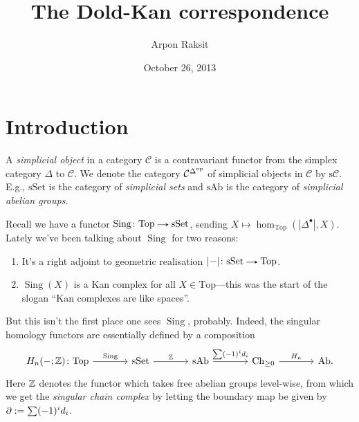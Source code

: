 

\title{The Dold-Kan correspondence}
\author{Arpon Raksit}
\date{October 26, 2013}


\maketitle
\thispagestyle{fancy}


\renewcommand{\C}{\mathcal{C}}
\newcommand{\Top}{\mathrm{Top}}
\newcommand{\Set}{\mathrm{Set}}
\newcommand{\Ab}{\mathrm{Ab}}
\newcommand{\Grp}{\mathrm{Grp}}
\newcommand{\Mod}{\mathrm{Mod}}
\newcommand{\Simplex}{\Delta}
\newcommand{\s}{\mathrm{s}}
\newcommand{\Ch}{\mathrm{Ch}}
\newcommand{\Sing}{\operatorname{Sing}}


\section{Introduction}

\begin{definition}
  A \textit{simplicial object} in a category $\C$ is a contravariant
  functor from the simplex category $\Simplex$ to $\C$. We denote the
  category $\C^{\Simplex^\op}$ of simplicial objects in $\C$ by
  $\s\C$. E.g., $\s\Set$ is the category of \textit{simplicial sets}
  and $\s\Ab$ is the category of \textit{simplicial abelian groups}.
\end{definition}

\begin{nothing}
  Recall we have a functor $\Sing \c \Top \to \s\Set$, sending $X
  \mapsto \hom_\Top(|\Delta^\bullet|, X)$. Lately we've been talking
  about $\Sing$ for two reasons:
  \begin{enumerate}
  \item It's a right adjoint to geometric realisation $|{-}| \c \s\Set
    \to \Top$.
  \item $\Sing(X)$ is a Kan complex for all $X \in \Top$---this was
    the start of the slogan ``Kan complexes are like spaces''.
  \end{enumerate}
  But this isn't the first place one sees $\Sing$, probably. Indeed,
  the singular homology functors are essentially defined by a
  composition
  \[
  \begin{tikzcd}[column sep = large]
    H_n(-;\Z) \c \Top \rar{\Sing} & \s\Set \rar{\Z} & \s\Ab \rar{\sum
      (-1)^i d_i} & \Ch_{\ge 0} \rar{H_n} & \Ab.
  \end{tikzcd}
  \]
  Here $\mathbb{Z}$ denotes the functor which takes free abelian groups
  level-wise, from which we get the \textit{singular chain complex} by
  letting the boundary map be given by $\partial \mathrel{:=} \sum (-1)^i
  d_i$.
\end{nothing}

